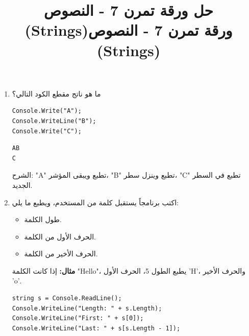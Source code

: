 \documentclass[14pt]{extarticle}
\title{حل ورقة تمرن 7 - النصوص (Strings)}
\title{ورقة تمرن 7 - النصوص (Strings)}
\begin{document}
\maketitle
\thispagestyle{fancy}

\begin{enumerate}[itemsep=2em]

    \item
    ما هو ناتج مقطع الكود التالي؟
    \begin{boxCode}
    \begin{english}
    \begin{verbatim}
Console.Write("A");
Console.WriteLine("B");
Console.Write("C");
    \end{verbatim}
    \end{english}
    \end{boxCode}
    \ifwithsols
    \begin{boxSolution}
    \begin{english}
    \begin{verbatim}
AB
C
    \end{verbatim}
    \end{english}
    الشرح: "A" تطبع ويبقى المؤشر، "B" تطبع وينزل سطر، "C" تطبع في السطر الجديد.
    \end{boxSolution}
    \fi

    \item
    اكتب برنامجاً يستقبل كلمة من المستخدم، ويطبع ما يلي:
    \begin{itemize}
        \item طول الكلمة.
        \item الحرف الأول من الكلمة.
        \item الحرف الأخير من الكلمة.
    \end{itemize}
    \textbf{مثال:} إذا كانت الكلمة \textenglish{"Hello"}، يطبع الطول 5، الحرف الأول \textenglish{'H'}، والحرف الأخير \textenglish{'o'}.

    \ifwithsols
    \begin{boxSolution}
    \begin{english}
    \begin{verbatim}
string s = Console.ReadLine();
Console.WriteLine("Length: " + s.Length);
Console.WriteLine("First: " + s[0]);
Console.WriteLine("Last: " + s[s.Length - 1]);
    \end{verbatim}
    \end{english}
    \end{boxSolution}
    \clearpage
    \fi


\end{enumerate}
\end{document}
